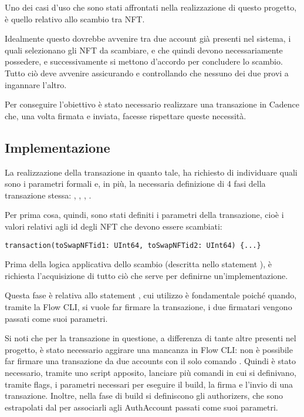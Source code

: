 Uno dei casi d'uso che sono stati affrontati nella realizzazione di questo progetto, è quello relativo allo scambio tra NFT.

Idealmente questo dovrebbe avvenire tra due account già presenti nel sistema, i quali selezionano gli NFT da scambiare, e che quindi devono necessariamente possedere, e successivamente si mettono d'accordo per concludere lo scambio. Tutto ciò deve avvenire assicurando e controllando che nessuno dei due provi a ingannare l'altro.

Per conseguire l'obiettivo è stato necessario realizzare una transazione in Cadence che, una volta firmata e inviata, facesse rispettare queste necessità.

\subsection{Implementazione}


La realizzazione della transazione in quanto tale, ha richiesto di individuare quali sono i parametri formali e, in più, la necessaria definizione di 4 fasi della transazione stessa: , , , .

Per prima cosa, quindi, sono stati definiti i parametri della transazione, cioè i valori relativi agli id degli NFT che devono essere scambiati:

\begin{lstlisting}[style=all, style=cadence]
transaction(toSwapNFTid1: UInt64, toSwapNFTid2: UInt64) {...}
\end{lstlisting}

Prima della logica applicativa dello scambio (descritta nello statement ), è richiesta l'acquisizione di tutto ciò che serve per definirne un'implementazione. 

Questa fase è relativa allo statement , cui utilizzo è fondamentale poiché quando, tramite la Flow CLI, si vuole far firmare la transazione, i due firmatari vengono passati come suoi parametri. 

Si noti che per la transazione in questione, a differenza di tante altre presenti nel progetto, è stato necessario aggirare una mancanza in Flow CLI: non è possibile far firmare una transazione da due accounts con il solo comando . Quindi è stato necessario, tramite uno script apposito, lanciare più comandi in cui si definivano, tramite flags, i parametri necessari per eseguire il build, la firma e l'invio di una transazione. Inoltre, nella fase di build si definiscono gli authorizers, che sono estrapolati dal  per associarli agli AuthAccount passati come suoi parametri.

